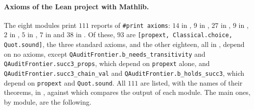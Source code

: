 \paragraph{Axioms of the Lean project with Mathlib.} The eight modules print $111$ reports of \texttt{\#print axioms}: $14$ in , $9$ in , $27$ in , $9$ in , $2$ in , $5$ in , $7$ in  and $38$ in . Of these, $93$ are \texttt{[propext, Classical.choice, Quot.sound]}, the three standard axioms, and the other eighteen, all in , depend on no axioms, except \texttt{QAuditFrontier.\allowbreak b\_needs\_transitivity} and \texttt{QAuditFrontier.\allowbreak succ3\_props}, which depend on \texttt{propext} alone, and \texttt{QAuditFrontier.\allowbreak succ3\_chain\_val} and \texttt{QAuditFrontier.\allowbreak b\_holds\_succ3}, which depend on \texttt{propext} and \texttt{Quot.sound}. All $111$ are listed, with the names of their theorems, in , against which  compares the output of each module. The main ones, by module, are the following.
